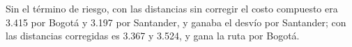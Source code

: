 Sin el término de riesgo, con las distancias sin corregir el costo compuesto era 3.415 por Bogotá y 3.197 por Santander, y ganaba el desvío por Santander; con las distancias corregidas es 3.367 y 3.524, y gana la ruta por Bogotá.
